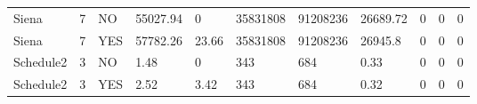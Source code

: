 \begin{table*}[]
\begin{tabular}{@{}lllllllllll@{}}
        Siena                                                    & 7                                                            & NO                                                                 & 55027.94                                                        & 0                                                                        & 35831808                                                       & 91208236                                                      & 26689.72                                                      & 0                                                                   & 0                                                                   & 0                                                           \\
        Siena                                                    & 7                                                            & YES                                                                & 57782.26                                                        & 23.66                                                                    & 35831808                                                       & 91208236                                                      & 26945.8                                                       & 0                                                                   & 0                                                                   & 0                                                           \\ \midrule
        Schedule2                                                & 3                                                            & NO                                                                 & 1.48                                                            & 0                                                                        & 343                                                            & 684                                                           & 0.33                                                          & 0                                                                   & 0                                                                   & 0                                                           \\
        Schedule2                                                & 3                                                            & YES                                                                & 2.52                                                            & 3.42                                                                     & 343                                                            & 684                                                           & 0.32                                                          & 0                                                                   & 0                                                                   & 0                                                           \\ \midrule

\end{tabular}
\end{table*}
